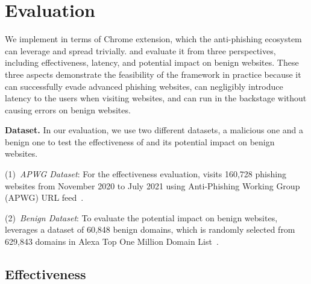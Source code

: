 


\section{Evaluation}
\label{s:eval}

We implement \spartacus in terms of Chrome extension, which the anti-phishing ecosystem can leverage and spread trivially.
and evaluate it from three perspectives, including effectiveness, latency, and potential impact on benign websites.
These three aspects demonstrate the feasibility of the \spartacus framework in practice because it can successfully evade advanced phishing websites, can negligibly introduce latency to the users when visiting websites, and can run in the backstage without causing errors on benign websites.

\noindent
\textbf{Dataset.}
In our evaluation, we use two different datasets, a malicious one and a benign one to test the effectiveness of \spartacus and its potential impact on benign websites.

\noindent
(1)~\emph{APWG Dataset}:
For the effectiveness evaluation, \spartacus visits 160,728 phishing websites from November 2020 to July 2021 using Anti-Phishing Working Group (APWG) URL feed~\cite{ecrimeexchange}.

\noindent
(2)~\emph{Benign Dataset}:
To evaluate the potential impact on benign websites, \spartacus leverages a dataset of 60,848 benign domains, which is randomly selected from 629,843 domains in Alexa Top One Million Domain List~\cite{AlexaTop1M}.






\subsection{Effectiveness}


